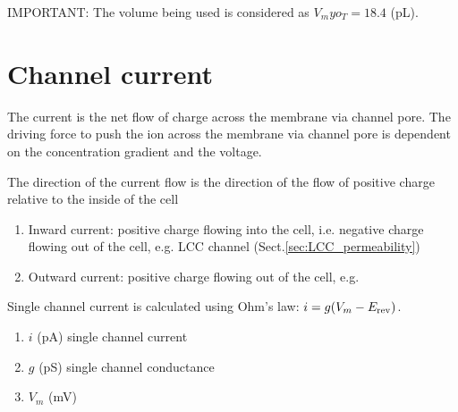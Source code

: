 IMPORTANT: The volume being used is considered as $V_myo_T=18.4$ (pL).
% 
% 
% 

\section{Channel current}
\label{sec:channel_current}

The current is the net flow of charge across the membrane via channel pore. The
driving force to push the ion across the membrane via channel pore is dependent
on the concentration gradient and the voltage.

The direction of the current flow is the direction of the flow of positive
charge relative to the inside of the cell
\begin{enumerate}
  \item Inward current: positive charge flowing into the cell, i.e. negative
  charge flowing out of the cell, e.g. LCC channel
  (Sect.\ref{sec:LCC_permeability})
  \item Outward current: positive charge flowing out of the cell, e.g. 
\end{enumerate}

Single channel current is calculated using Ohm's law: $i=g(V_m-E_{\text{rev}})$. 
\begin{enumerate}
  \item $i$ (pA) single channel current
  \item $g$ (pS) single channel conductance
  \item $V_m$ (mV)
\end{enumerate}

